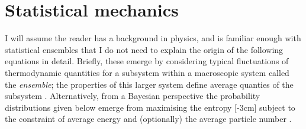 \section{Statistical mechanics}

I will assume the reader has a background in physics, and is familiar enough with statistical ensembles that I do not need to explain the origin of the following equations in detail.
Briefly, these emerge by considering typical fluctuations of thermodynamic quantities for a subsystem within a macroscopic system called the \emph{ensemble}; the properties of this larger system define average quanties of the subsystem \cite{standard-text}.
Alternatively, from a Bayesian perspective the probability distributions given below emerge from maximising the entropy%
[-3cm]
subject to the constraint of average energy and (optionally) the average particle number \cite{Jaynes1957a,Jaynes1957b}.

